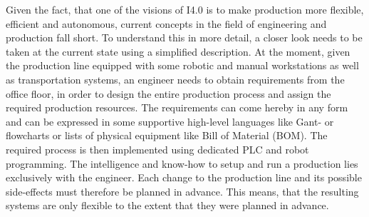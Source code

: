 Given the fact, that one of the visions of \ac{I4.0} is to make production more flexible, efficient and autonomous, current concepts in the field of engineering and production fall short. To understand this in more detail, a closer look needs to be taken at the current state using a simplified description. At the moment, given the production line equipped with some robotic and manual workstations as well as transportation systems, an engineer needs to obtain requirements from the office floor, in order to design the entire production process and assign the required production resources. The requirements can come hereby in any form and can be expressed in some supportive high-level languages like Gant- or flowcharts or lists of physical equipment like Bill of Material (BOM). The required process is then implemented using dedicated \ac{PLC} and robot programming. The intelligence and know-how to setup and run a production lies exclusively with the engineer. Each change to the production line and its possible side-effects must therefore be planned in advance. This means, that the resulting systems are only flexible to the extent that they were planned in advance.
